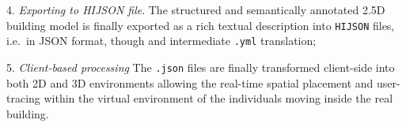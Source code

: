 4. \textit{Exporting to HIJSON file}.
The  structured and semantically annotated 2.5D building model is finally  exported as a rich textual description into \texttt{HIJSON} files, i.e.~in JSON format, though and intermediate \texttt{.yml} translation;

5. \textit{Client-based processing}
  The \texttt{.json} files are finally transformed client-side into both
  2D and 3D environments allowing the real-time spatial placement and
  user-tracing within the virtual environment of the individuals moving
  inside the real building.

